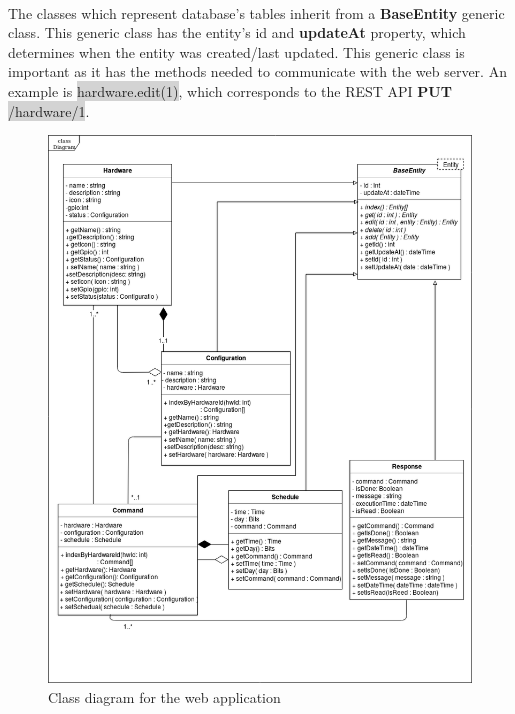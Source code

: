 \documentclass[12pt, oneside, a4paper]{book}
\newcommand{\code}[1]{{\color{red}\colorbox{lightgray}{#1}}}
\begin{document}
					\paragraph{}The classes which represent database's tables inherit from a \textbf{BaseEntity} generic class. This generic class has the entity's id and \textbf{updateAt} property, which determines when the entity was created/last updated. This generic class is important as it has the methods needed to communicate with the web server. An example is \code{hardware.edit(1)}, which corresponds to the REST API \textbf{PUT} \code{/hardware/1}.
					\begin{figure}[H]
						\includegraphics[width=\linewidth]{img/diagram_class1.png}
						\caption{Class diagram for the web application}
						\label{fig:class_web}
					\end{figure}
\end{document}
